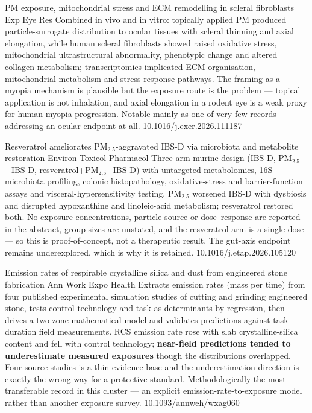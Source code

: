 \documentclass[10pt]{article}
\begin{document}

{PM exposure, mitochondrial stress and ECM remodelling in scleral fibroblasts}
{Exp Eye Res}
{Combined in vivo and in vitro: topically applied PM produced particle-surrogate
distribution to ocular tissues with scleral thinning and axial elongation, while human
scleral fibroblasts showed raised oxidative stress, mitochondrial ultrastructural
abnormality, phenotypic change and altered collagen metabolism; transcriptomics
implicated ECM organisation, mitochondrial metabolism and stress-response pathways. The
framing as a myopia mechanism is plausible but the exposure route is the problem ---
topical application is not inhalation, and axial elongation in a rodent eye is a weak
proxy for human myopia progression. Notable mainly as one of very few records addressing
an ocular endpoint at all.}
{10.1016/j.exer.2026.111187}

{Resveratrol ameliorates PM$_{2.5}$-aggravated IBS-D via microbiota and metabolite restoration}
{Environ Toxicol Pharmacol}
{Three-arm murine design (IBS-D, PM$_{2.5}$+IBS-D, resveratrol+PM$_{2.5}$+IBS-D) with
untargeted metabolomics, 16S microbiota profiling, colonic histopathology,
oxidative-stress and barrier-function assays and visceral-hypersensitivity testing.
PM$_{2.5}$ worsened IBS-D with dysbiosis and disrupted hypoxanthine and linoleic-acid
metabolism; resveratrol restored both. No exposure concentrations, particle source or
dose--response are reported in the abstract, group sizes are unstated, and the
resveratrol arm is a single dose --- so this is proof-of-concept, not a therapeutic
result. The gut-axis endpoint remains underexplored, which is why it is retained.}
{10.1016/j.etap.2026.105120}


{Emission rates of respirable crystalline silica and dust from engineered stone fabrication}
{Ann Work Expo Health}
{Extracts emission rates (mass per time) from four published experimental simulation
studies of cutting and grinding engineered stone, tests control technology and task as
determinants by regression, then drives a two-zone mathematical model and validates
predictions against task-duration field measurements. RCS emission rate rose with slab
crystalline-silica content and fell with control technology; \textbf{near-field
predictions tended to underestimate measured exposures} though the distributions
overlapped. Four source studies is a thin evidence base and the underestimation direction
is exactly the wrong way for a protective standard. Methodologically the most
transferable record in this cluster --- an explicit emission-rate-to-exposure model
rather than another exposure survey.}
{10.1093/annweh/wxag060}
\end{document}
